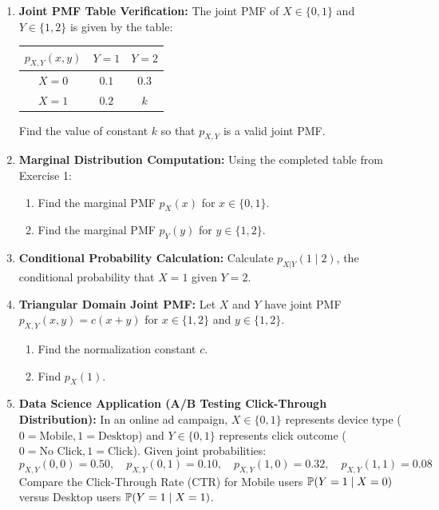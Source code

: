 \begin{enumerate}
\item \textbf{Joint PMF Table Verification:} The joint PMF of $X \in \{0, 1\}$ and $Y \in \{1, 2\}$ is given by the table:
\begin{center}
\begin{tabular}{c|cc}
$p_{X,Y}(x, y)$ & $Y = 1$ & $Y = 2$ \\
\hline
$X = 0$ & $0.1$ & $0.3$ \\
$X = 1$ & $0.2$ & $k$ \\
\end{tabular}
\end{center}
Find the value of constant $k$ so that $p_{X,Y}$ is a valid joint PMF.

\item \textbf{Marginal Distribution Computation:} Using the completed table from Exercise 1:
    \begin{enumerate}
        \item Find the marginal PMF $p_X(x)$ for $x \in \{0, 1\}$.
        \item Find the marginal PMF $p_Y(y)$ for $y \in \{1, 2\}$.
    \end{enumerate}

\item \textbf{Conditional Probability Calculation:} Calculate $p_{X|Y}(1 \mid 2)$, the conditional probability that $X = 1$ given $Y = 2$.

\item \textbf{Triangular Domain Joint PMF:} Let $X$ and $Y$ have joint PMF $p_{X,Y}(x, y) = c(x + y)$ for $x \in \{1, 2\}$ and $y \in \{1, 2\}$.
    \begin{enumerate}
        \item Find the normalization constant $c$.
        \item Find $p_X(1)$.
    \end{enumerate}

\item \textbf{Data Science Application (A/B Testing Click-Through Distribution):} In an online ad campaign, $X \in \{0, 1\}$ represents device type ($0 = \text{Mobile}, 1 = \text{Desktop}$) and $Y \in \{0, 1\}$ represents click outcome ($0 = \text{No Click}, 1 = \text{Click}$). Given joint probabilities:
$$p_{X,Y}(0,0) = 0.50, \quad p_{X,Y}(0,1) = 0.10, \quad p_{X,Y}(1,0) = 0.32, \quad p_{X,Y}(1,1) = 0.08$$
Compare the Click-Through Rate (CTR) for Mobile users $\P(Y=1 \mid X=0)$ versus Desktop users $\P(Y=1 \mid X=1)$.
\end{enumerate}

